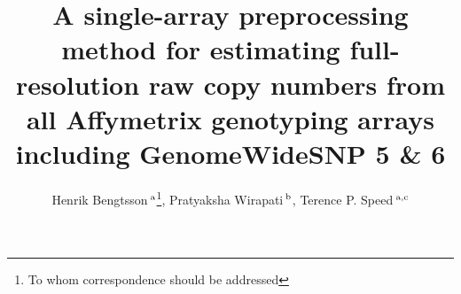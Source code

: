 \documentclass{bioinfo}
\begin{document}

\title[CRMA~v2]{A single-array preprocessing method for estimating full-resolution raw copy numbers from all Affymetrix genotyping arrays including GenomeWideSNP 5 \& 6}
\author[Bengtsson \& Speed]{Henrik Bengtsson\,$^{\rm a}$\footnote{To whom correspondence should be addressed}, Pratyaksha Wirapati\,$^{\rm b}$, Terence P. Speed\,$^{\rm a,c}$}
\address{
  $^{\rm a}$ Department of Statistics, University of California, Berkeley, USA.
  $^{\rm b}$ Bioinformatics Core Facility, Swiss Institute of Bioinformatics, Lausanne, Switzerland.
  $^{\rm c}$ Bioinformatics Division, Walter \& Eliza Hall Institute of Medical Research, Parkville, Australia.
} 



\maketitle
\end{document}
